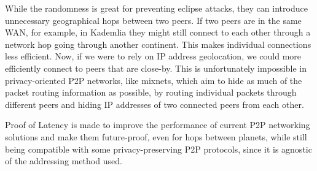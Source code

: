 While the randomness is great for preventing eclipse attacks, they can introduce unnecessary geographical hops between two peers. If two peers are in the same WAN, for example, in Kademlia they might still connect to each other through a network hop going through another continent. This makes individual connections less efficient.
Now, if we were to rely on IP address geolocation, we could more efficiently connect to peers that are close-by. This is unfortunately impossible in privacy-oriented P2P networks, like mixnets, which aim to hide as much of the packet routing information as possible, by routing individual packets through different peers and hiding IP addresses of two connected peers from each other.\cite{Harry_Halpin_undated-sq}

Proof of Latency is made to improve the performance of current P2P networking solutions and make them future-proof, even for hops between planets, while still being compatible with some privacy-preserving P2P protocols, since it is agnostic of the addressing method used.

